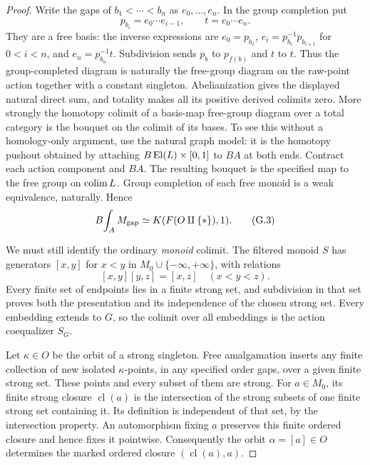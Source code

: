 \begin{proof}
Write the gaps of $b_1<\cdots<b_n$ as $e_0,\ldots,e_n$.
In the group completion put
\[
 p_{b_i}=e_0\cdots e_{i-1},\qquad t=e_0\cdots e_n.
\]
They are a free basis: the inverse expressions are
$e_0=p_{b_1}$, $e_i=p_{b_i}^{-1}p_{b_{i+1}}$ for $0<i<n$,
and $e_n=p_{b_n}^{-1}t$.  Subdivision sends $p_b$ to $p_{f(b)}$
and $t$ to $t$.  Thus the group-completed diagram is naturally
the free-group diagram on the raw-point action together with a
constant singleton.  Abelianization gives the displayed natural
direct sum, and totality makes all its positive derived colimits
zero.  More strongly the homotopy colimit of a basis-map free-group
diagram over a total category is the bouquet on the colimit of its
bases.  To see this without a homology-only argument, use the
natural graph model: it is the homotopy pushout obtained by attaching
$B\operatorname{El}(L)\times[0,1]$ to $BA$ at both ends.  Contract each action
component and $BA$.  The resulting bouquet is the specified map
to the free group on $\operatorname*{colim} L$.  Group completion of each free
monoid is a weak equivalence, naturally.  Hence
\[
 B\!\int_A M_{\rm gap}\simeq K(F(O\amalg\{*\}),1).
 \tag{G.3}
\]

We must still identify the ordinary \emph{monoid} colimit.
The filtered monoid $S$ has generators $[x,y]$ for
$x<y$ in $M_0\cup\{-\infty,+\infty\}$, with relations
\[
 [x,y][y,z]=[x,z]\quad(x<y<z).
 \tag{G.4}
\]
Every finite set of endpoints lies in a finite strong set, and
subdivision in that set proves both the presentation and its
independence of the chosen strong set.  Every embedding extends
to $G$, so the colimit over all embeddings is the action
coequalizer $S_G$.

Let $\kappa\in O$ be the orbit of a strong singleton.  Free
amalgamation inserts any finite collection of new isolated
$\kappa$-points, in any specified order gaps, over a given finite
strong set.  These points and every subset of them are strong.
For $a\in M_0$, its finite strong closure $\operatorname{cl}(a)$
is the intersection of the strong subsets of one finite strong
set containing it.  Its definition is independent of that set,
by the intersection property.  An automorphism fixing $a$
preserves this finite ordered closure and hence fixes it pointwise.
Consequently the orbit $\alpha=[a]\in O$ determines the marked
ordered closure $(\operatorname{cl}(a),a)$.


\end{proof}
